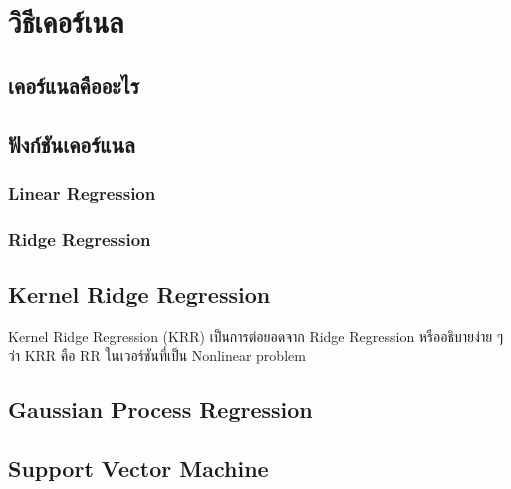 

\chapter{วิธีเคอร์เนล}
\label{ch:kernel}

\section{เคอร์แนลคืออะไร}

\section{ฟังก์ชันเคอร์แนล}

\subsection{Linear Regression}

\subsection{Ridge Regression}

\section{Kernel Ridge Regression}

Kernel Ridge Regression (KRR) เป็นการต่อยอดจาก Ridge Regression หรืออธิบายง่าย ๆ ว่า KRR คือ RR ในเวอร์ชันที่เป็น Nonlinear problem

\section{Gaussian Process Regression}

\section{Support Vector Machine}


